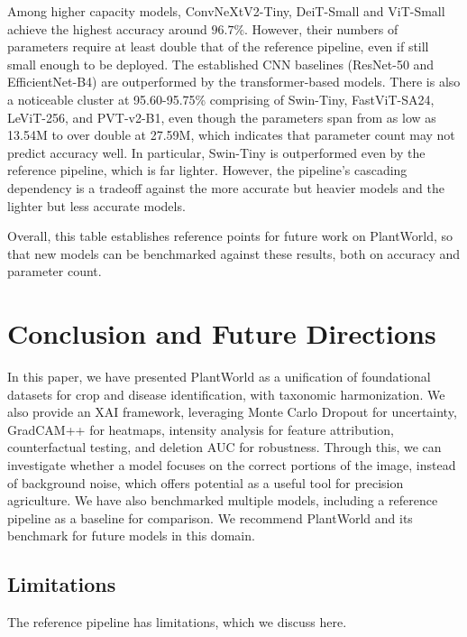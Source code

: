 \documentclass{bmvc2k}
\begin{document}
Among higher capacity models, ConvNeXtV2-Tiny, DeiT-Small and ViT-Small achieve the highest accuracy around $96.7\%$. However, their numbers of parameters require at least double that of the reference pipeline, even if still small enough to be deployed. The established CNN baselines (ResNet-50 and EfficientNet-B4) are outperformed by the transformer-based models. There is also a noticeable cluster at 95.60-95.75\% comprising of Swin-Tiny, FastViT-SA24, LeViT-256, and PVT-v2-B1, even though the parameters span from as low as 13.54M to over double at 27.59M, which indicates that parameter count may not predict accuracy well. In particular, Swin-Tiny is outperformed even by the reference pipeline, which is far lighter. However, the pipeline's cascading dependency is a tradeoff against the more accurate but heavier models and the lighter but less accurate models.

Overall, this table establishes reference points for future work on PlantWorld, so that new models can be benchmarked against these results, both on accuracy and parameter count.

\section{Conclusion and Future Directions}
\label{sec:conclusion}

In this paper, we have presented PlantWorld as a unification of foundational datasets for crop and disease identification, with taxonomic harmonization. We also provide an XAI framework, leveraging Monte Carlo Dropout for uncertainty, GradCAM++ for heatmaps, intensity analysis for feature attribution, counterfactual testing, and deletion AUC for robustness. Through this, we can investigate whether a model focuses on the correct portions of the image, instead of background noise, which offers potential as a useful tool for precision agriculture. We have also benchmarked multiple models, including a reference pipeline as a baseline for comparison. We recommend PlantWorld and its benchmark for future models in this domain.

\subsection{Limitations}

The reference pipeline has limitations, which we discuss here.
\end{document}
